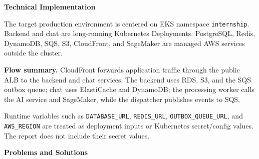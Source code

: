 \vspace{0.5em}\noindent\textbf{Technical Implementation}\par

The target production environment is centered on EKS namespace
\texttt{internship}. Backend and chat are long-running Kubernetes
Deployments. PostgreSQL, Redis, DynamoDB, SQS, S3, CloudFront, and
SageMaker are managed AWS services outside the cluster.

\textbf{Flow summary.} CloudFront forwards application traffic through
the public ALB to the backend and chat services. The backend uses RDS,
S3, and the SQS outbox queue; chat uses ElastiCache and DynamoDB; the
processing worker calls the AI service and SageMaker, while the
dispatcher publishes events to SQS.

Runtime variables such as \texttt{DATABASE\_\allowbreak{}URL}, \texttt{REDIS\_\allowbreak{}URL},
\texttt{OUTBOX\_\allowbreak{}QUEUE\_\allowbreak{}URL}, and \texttt{AWS\_\allowbreak{}REGION} are treated as
deployment inputs or Kubernetes secret/config values. The report does
not include their secret values.

\vspace{0.5em}\noindent\textbf{Problems and Solutions}\par

